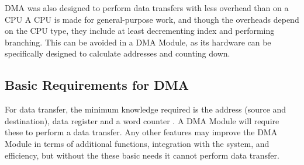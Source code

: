 DMA was also designed to perform data transfers with less overhead than on a CPU \cite[p~318]{encyclopedia}
A CPU is made for general-purpose work, and though the overheads depend on the CPU type, they include at least decrementing index and performing branching.
This can be avoided in a DMA Module, as its  hardware can be specifically designed to calculate addresses and counting down.

\subsection{Basic Requirements for DMA}
For data transfer, the minimum knowledge required is the address (source and destination), data register and a word counter \cite[p~876-877]{encyclopedia}.
A DMA Module will require these to perform a data transfer.
Any other features may improve the DMA Module in terms of additional functions, integration with the system, and efficiency, but without the these basic needs it cannot perform data transfer.


